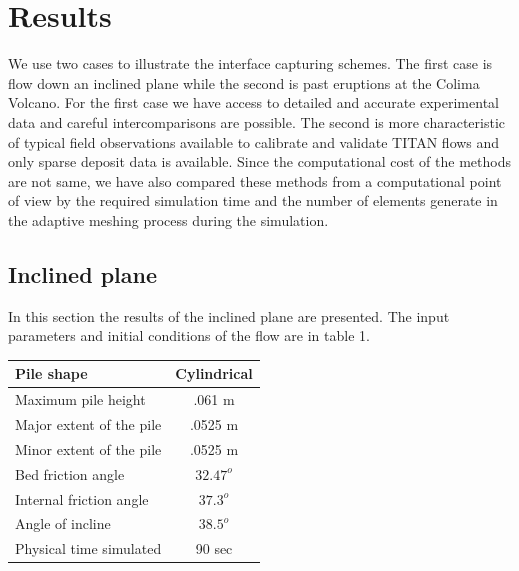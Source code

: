 \documentclass[review]{elsarticle}
\begin{document}
\section{Results} \label{results}
We use two cases to illustrate the  interface capturing schemes. The first case is flow down an inclined plane while the second is past eruptions at the Colima Volcano. 
For the first case we have access to  detailed and accurate  experimental data and careful intercomparisons are possible. 
The second is more characteristic of typical field observations available to calibrate and validate TITAN flows and only sparse deposit data is available.
%
Since the computational cost of the methods are not same, we have also compared these methods from a computational point of view by the required simulation time and the number of elements generate in the adaptive meshing process
during the simulation. 

\subsection{Inclined plane}
In this section the results of the inclined plane are presented. The input parameters and initial conditions of the flow are in  table 1.
\begin{center}
        \begin{tabular}{|l|c|}
                \hline
                Pile shape       & Cylindrical \\
                \hline
                Maximum pile height       & .061 m \\
                \hline
                Major extent of the pile  & .0525 m \\
                \hline
                Minor extent of the pile  & .0525 m \\
                \hline           
                Bed friction angle        & $32.47^o$ \\
                \hline
                Internal friction angle  & $37.3^o$ \\
                \hline
                Angle of incline          & $38.5^o$ \\
                \hline
                Physical time simulated   &  90 sec \\
                \hline
        \end{tabular}
\end{center}
\end{document}
